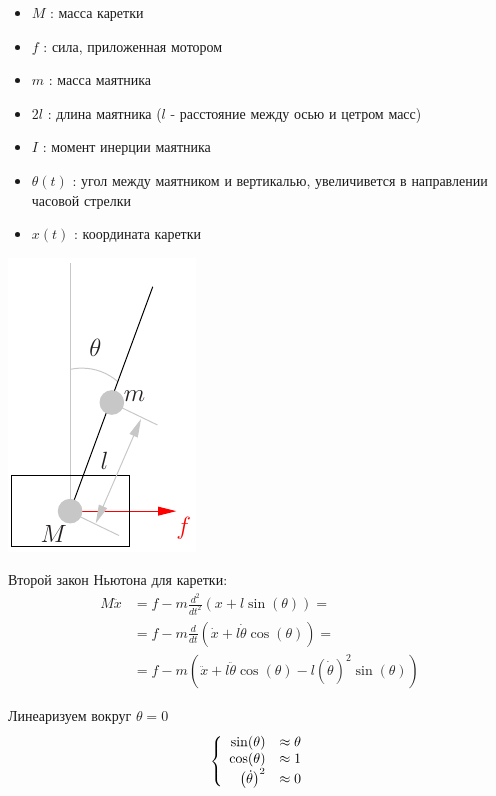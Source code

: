 \documentclass{article}
\begin{document}
\thispagestyle{empty}
\begin{itemize}
\item $M$ : масса каретки %
\item $f$ : сила, приложенная мотором %
\item $m$ : масса маятника %
\item $2l$ : длина маятника ($l$ - расстояние между осью и цетром масс) %
\item $I$ : момент инерции маятника %
\item $\theta(t)$ : угол между маятником и вертикалью, увеличивется в направлении часовой стрелки %
\item $x(t)$ : координата каретки %
\end{itemize}

\centerline{\includegraphics[width=.3\linewidth]{schema.pdf}}



Второй закон Ньютона для каретки:
\begin{align*}
M\ddot{x} & = f - m\frac{d^2}{dt^2}(x + l\sin(\theta)) = \\
          & = f - m\frac{d}{dt}(\dot{x} + l\dot{\theta}\cos(\theta)) = \\
          & = f - m(\ddot{x} + l\ddot{\theta}\cos(\theta) - l\left(\dot{\theta}\right)^2\sin(\theta))
\end{align*}


Линеаризуем вокруг $\theta=0$
$$
\left \{ \begin{array}{r l}
\sin(\theta) & \approx \theta \\
\cos(\theta) & \approx 1      \\
\left(\dot{\theta}\right)^2 & \approx 0
\end{array} \right.
$$
\end{document}
